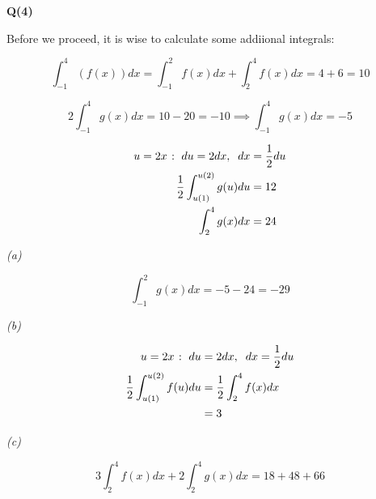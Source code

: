 \documentclass[12pt, a4paper]{article}
\begin{document}
\textbf{Q(4)}

Before we proceed, it is wise to calculate some addiional integrals:

\[
    \int_{-1}^4 (f(x)) dx = \int_{-1}^2 f(x)dx + \int_2^4 f(x) dx = 4 + 6 = 10
\]

\[
    2 \int_{-1}^{4} g(x) dx = 10 - 20 = -10 \implies \int_{-1}^{4} g(x) dx = -5
\]

\begin{align*}
    u = 2x \; \colon \; du = 2dx, \;\; dx & = \frac{1}{2}du\\
    \frac{1}{2} \int_{u(1)}^{u(2)} g(u) du & = 12\\
    \int_2^4 g(x) dx & = 24\\
\end{align*}

\textit{(a)}

\[
    \int_{-1}^{2} g(x) dx = -5 - 24 = -29
\]

\textit{(b)}

\begin{align*}
    u = 2x \; \colon \; du & = 2dx, \;\; dx = \frac{1}{2}du\\
    \frac{1}{2} \int_{u(1)}^{u(2)} f(u) du 
    & = \frac{1}{2} \int_2^4 f(x) dx\\
    & = 3
\end{align*}

\textit{(c)}

\[
    3 \int_2^4 f(x) dx + 2 \int_2^4 g(x) dx = 18 + 48 + 66
\]
\end{document}
